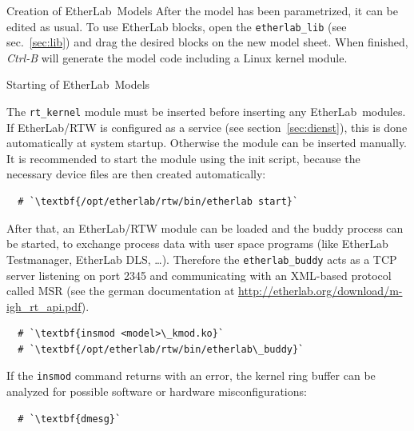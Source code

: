 \begin{ighsec}{Creation of EtherLab\regTM\ Models}
After the model has been parametrized, it can be edited as usual. To use
EtherLab blocks, open the \texttt{etherlab\_lib} (see sec.~\ref{sec:lib}) and drag the
desired blocks on the new model sheet. When finished, \textit{Ctrl-B} will
generate the model code including a Linux kernel module.

\end{ighsec}


\begin{ighsec}{Starting of EtherLab\regTM\ Models}
\label{sec:start}

The \texttt{rt\_kernel} module must be inserted before inserting any
EtherLab\regTM\ modules. If EtherLab\regTM/RTW is configured as a
service (see section~\ref{sec:dienst}), this is done automatically at
system startup. Otherwise the module can be inserted manually. It is
recommended to start the module using the init script, because the
necessary device files are then created automatically:

\begin{lstlisting}
  # `\textbf{/opt/etherlab/rtw/bin/etherlab start}`
\end{lstlisting}

After that, an EtherLab\regTM/RTW module can be loaded and the buddy process
can be started, to exchange process data with user space programs (like
EtherLab Testmanager, EtherLab DLS, \ldots). Therefore the
\texttt{etherlab\_buddy} acts as a TCP server listening on port 2345 and
communicating with an XML-based protocol called MSR (see the german
documentation at \url{http://etherlab.org/download/m-igh_rt_api.pdf}).

\begin{lstlisting}
  # `\textbf{insmod <model>\_kmod.ko}`
  # `\textbf{/opt/etherlab/rtw/bin/etherlab\_buddy}`
\end{lstlisting}

If the \texttt{insmod} command returns with an error, the kernel ring
buffer can be analyzed for possible software or hardware
misconfigurations:

\begin{lstlisting}
  # `\textbf{dmesg}`
\end{lstlisting}

\end{ighsec}

